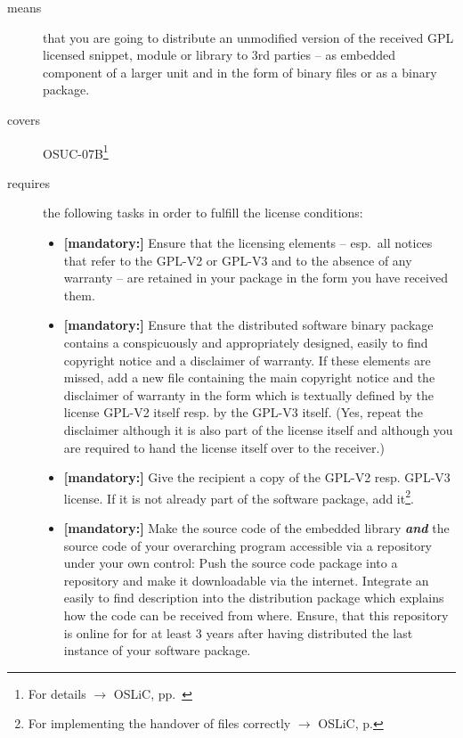 \begin{description}
\item[means] that you are going to distribute an unmodified version of the
received GPL licensed snippet, module or library to 3rd parties -- as embedded
component of a larger unit and in the form of binary files or as a bi\-na\-ry
package.


\item[covers] OSUC-07B\footnote{For details $\rightarrow$ OSLiC, pp.\
\pageref{OSUC-07B-DEF}}

\item[requires] the following tasks in order to fulfill the license conditions:
\begin{itemize}
  
  \item \textbf{[mandatory:]} Ensure that the licensing elements -- esp.\ all
  notices that refer to the GPL-V2 or GPL-V3 and to the absence of any
  warranty -- are retained in your package in the form you have received them.

  \item \textbf{[mandatory:]} Ensure that the distributed software binary
  package contains a conspicuously and appropriately designed, easily to find
  copyright notice and a disclaimer of warranty. If these elements are missed,
  add a new file containing the main copyright notice and the disclaimer of
  warranty in the form which is textually defined by the license GPL-V2 itself
  resp. by the GPL-V3 itself. (Yes, repeat the disclaimer although it is also
  part of the license itself and although you are required to hand the license
  itself over to the receiver.)
  
  \item \textbf{[mandatory:]} Give the recipient a copy of the GPL-V2 resp.
  GPL-V3 license. If it is not already part of the software package, add
  it\footnote{For implementing the handover of files correctly $\rightarrow$
  OSLiC, p. \pageref{DistributingFilesHint}}.
  
  \item \textbf{[mandatory:]} Make the source code of the embedded library
  \textbf{\emph{and}} the source code of your overarching program accessible via
  a repository under your own control: Push the source code package into a
  repository and make it downloadable via the internet. Integrate an easily to
  find description into the distribution package which explains how the code can
  be received from where. Ensure, that this repository is online for for at
  least 3 years after having distributed the last instance of your software
  package.
  

\end{itemize}
\end{description}
